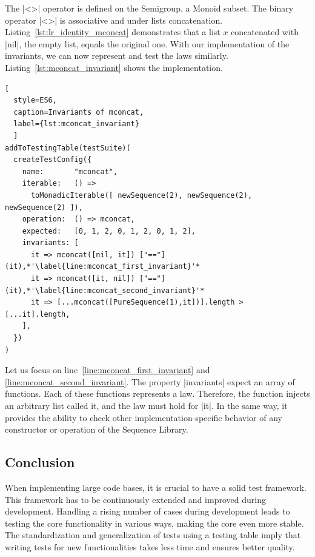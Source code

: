 The |<>| operator is defined on the Semigroup, a Monoid subset. The binary 
operator |<>| is associative and under lists concatenation. Listing~\ref{lst:lr_identity_mconcat} 
demonstrates that a list $x$ concatenated with |nil|, the empty list, equals the original 
one. With our implementation of the invariants, we can now represent and 
test the laws similarly. Listing~\ref{lst:mconcat_invariant} shows the
implementation.

\begin{lstlisting}[
  style=ES6, 
  caption=Invariants of mconcat,
  label={lst:mconcat_invariant}
  ]
addToTestingTable(testSuite)(
  createTestConfig({
    name:       "mconcat",
    iterable:   () => 
      toMonadicIterable([ newSequence(2), newSequence(2), newSequence(2) ]),
    operation:  () => mconcat,
    expected:   [0, 1, 2, 0, 1, 2, 0, 1, 2],
    invariants: [
      it => mconcat([nil, it]) ["=="] (it),*'\label{line:mconcat_first_invariant}'*
      it => mconcat([it, nil]) ["=="] (it),*'\label{line:mconcat_second_invariant}'*
      it => [...mconcat([PureSequence(1),it])].length > [...it].length,
    ],
  })
)
\end{lstlisting}

Let us focus on line~\ref{line:mconcat_first_invariant} and 
\ref{line:mconcat_second_invariant}.
The property |invariants| expect an array of functions. Each of these
functions represents a law. Therefore, the function injects an arbitrary list
called it, and the law must hold for |it|. In the same way, it provides the
ability to check other implementation-specific behavior
of any constructor or operation of the Sequence Library.

\subsection{Conclusion}
\label{sub:Conclusion}
When implementing large code bases, it is crucial to have a solid test
framework. This framework has to be continuously extended and improved during
development.
Handling a rising number of cases during development leads to testing the core
functionality in various ways, making the core even more stable.
\newline
The standardization and generalization of tests using a testing table imply that
writing tests for new functionalities takes less time and ensures better
quality.
